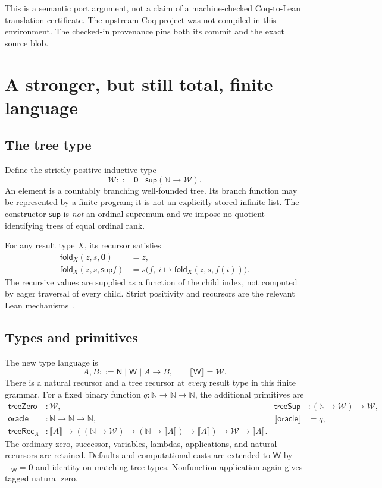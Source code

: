 \documentclass[11pt]{article}
\theoremstyle{definition}
\newcommand{\N}{\mathbb N}
\newcommand{\W}{\mathcal W}
\newcommand{\Sup}{\mathsf{sup}}
\newcommand{\leaf}{\mathbf 0}
\newcommand{\tyN}{\mathsf N}
\newcommand{\tyW}{\mathsf W}
\newcommand{\Oc}{\mathsf{oracle}}
\newcommand{\sem}[1]{\llbracket #1\rrbracket}
\begin{document}
This is a semantic port argument, not a claim of a machine-checked
Coq-to-Lean translation certificate. The upstream Coq project was not compiled
in this environment. The checked-in provenance pins both its commit and the
exact source blob.

\section{A stronger, but still total, finite language}
\label{sec:language}

\subsection{The tree type}

Define the strictly positive inductive type
\begin{equation}\label{eq:tree}
 \W ::= \leaf \mid \Sup(\N\to\W).
\end{equation}
An element is a countably branching well-founded tree. Its branch function
may be represented by a finite program; it is not an explicitly stored
infinite list. The constructor $\Sup$ is \emph{not} an ordinal supremum and we
impose no quotient identifying trees of equal ordinal rank.

For any result type $X$, its recursor satisfies
\begin{align}
 \mathsf{fold}_X(z,s,\leaf)&=z,\label{eq:wfold}\\
 \mathsf{fold}_X(z,s,\Sup f)&=
 s\bigl(f,\ i\mapsto\mathsf{fold}_X(z,s,f(i))\bigr).
\end{align}
The recursive values are supplied as a function of the child index, not
computed by eager traversal of every child. Strict positivity and recursors
are the relevant Lean mechanisms~\cite{leaninductive,leanrecursive}.

\subsection{Types and primitives}

The new type language is
\[
 A,B ::= \tyN\mid\tyW\mid A\to B,
 \qquad\sem{\tyW}=\W.
\]
There is a natural recursor and a tree recursor at \emph{every} result type
in this finite grammar. For a fixed binary function $q:\N\to\N\to\N$, the
additional primitives are
\begin{align*}
 \mathsf{treeZero}&:\W,&
 \mathsf{treeSup}&:(\N\to\W)\to\W,\\
 \Oc&:\N\to\N\to\N,&\sem{\Oc}&=q,\\
 \mathsf{treeRec}_A&:\sem A\to
 ((\N\to\W)\to(\N\to\sem A)\to\sem A)\to\W\to\sem A.
\end{align*}
The ordinary zero, successor, variables, lambdas, applications, and natural
recursors are retained. Defaults and computational casts are extended to
$\tyW$ by $\bot_{\tyW}=\leaf$ and identity on matching tree types.
Nonfunction application again gives tagged natural zero.
\end{document}
